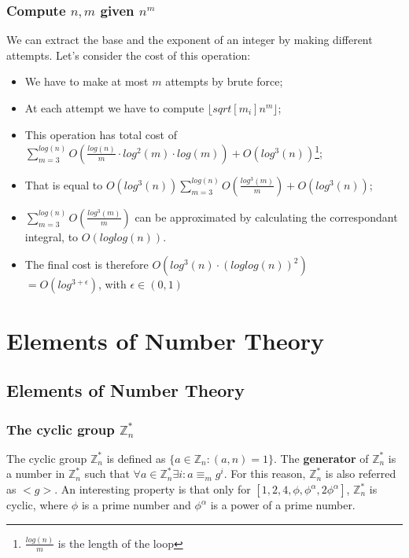 \documentclass[12pt, a4paper, english]{report}
\begin{document}
\subsection{Compute $n, m$ given $n^{m}$}
We can extract the base and the exponent of an integer by making different attempts.\newline
Let's consider the cost of this operation:
\begin{itemize}
    \item We have to make at most $m$ attempts by brute force;
    \item At each attempt we have to compute $\lfloor sqrt[m_{i}]{n^{m}} \rfloor$;
    \item This operation has total cost of $\sum_{m=3}^{log(n)} O(\frac{log(n)}{m} \cdot log^{2}(m) \cdot log(m)) + O(log^{3}(n))$\footnote{$\frac{log(n)}{m}$ is the length of the loop};
    \item That is equal to $O(log^{3}(n)) \sum_{m=3}^{log(n)} O(\frac{log^{3}(m)}{m}) + O(log^{3}(n))$;
    \item $\sum_{m=3}^{log(n)} O(\frac{log^{3}(m)}{m})$ can be approximated by calculating the correspondant integral, to $O(loglog(n))$.
    \item The final cost is therefore $O(log^{3}(n) \cdot (loglog(n))^{2})$ \\
    $= O(log^{3 + \epsilon})$, with $\epsilon \in (0,1)$
\end{itemize}


\chapter{Elements of Number Theory}

\section{Elements of Number Theory}
\subsection{The cyclic group $\mathbb{Z}_{n}^{*}$}
The cyclic group $\mathbb{Z}_{n}^{*}$ is defined as $\{a \in \mathbb{Z}_{n}: (a,n) = 1\}$.\newline
The \textbf{generator} of $\mathbb{Z}_{n}^{*}$ is a number in $\mathbb{Z}_{n}^{*}$ such that
$\forall a \in \mathbb{Z}_{n}^{*} \exists i: a \equiv_{m} g^{i}$.
For this reason, $\mathbb{Z}_{n}^{*}$ is also referred as $< g >$.\newline
An interesting property is that only for $[1,2,4, \phi, \phi^{\alpha}, 2 \phi^{\alpha}]$,
 $\mathbb{Z}_{n}^{*}$ is cyclic, where $\phi$ is a prime number and $\phi^\alpha$ is a power of a prime number.\newline
\end{document}
